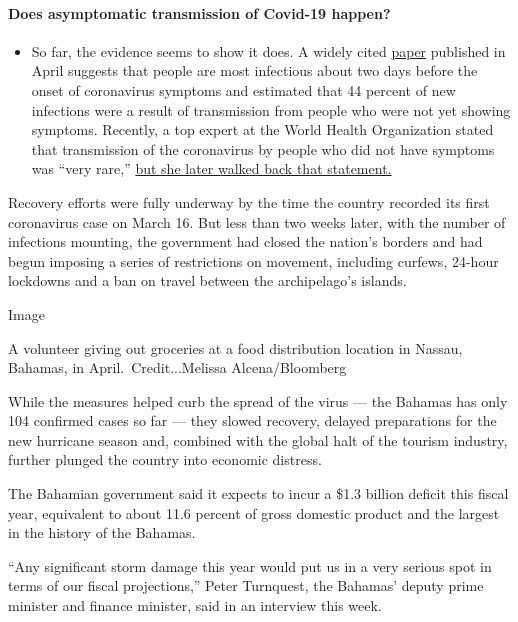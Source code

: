 \begin{itemize}
{  \paragraph{Does asymptomatic transmission of Covid-19
  happen?}\label{does-asymptomatic-transmission-of-covid-19-happen}}

  \begin{itemize}
  \tightlist
  \item
    So far, the evidence seems to show it does. A widely cited
    \href{https://www.nature.com/articles/s41591-020-0869-5}{paper}
    published in April suggests that people are most infectious about
    two days before the onset of coronavirus symptoms and estimated that
    44 percent of new infections were a result of transmission from
    people who were not yet showing symptoms. Recently, a top expert at
    the World Health Organization stated that transmission of the
    coronavirus by people who did not have symptoms was ``very rare,''
    \href{https://www.nytimes.com/2020/06/09/world/coronavirus-updates.html?action=click\&pgtype=Article\&state=default\&region=MAIN_CONTENT_3\&context=storylines_faq\#link-1f302e21}{but
    she later walked back that statement.}
  \end{itemize}
\end{itemize}

Recovery efforts were fully underway by the time the country recorded
its first coronavirus case on March 16. But less than two weeks later,
with the number of infections mounting, the government had closed the
nation's borders and had begun imposing a series of restrictions on
movement, including curfews, 24-hour lockdowns and a ban on travel
between the archipelago's islands.

Image

A volunteer giving out groceries at a food distribution location in
Nassau, Bahamas, in April.~Credit...Melissa Alcena/Bloomberg

While the measures helped curb the spread of the virus --- the Bahamas
has only 104 confirmed cases so far --- they slowed recovery, delayed
preparations for the new hurricane season and, combined with the global
halt of the tourism industry, further plunged the country into economic
distress.

The Bahamian government said it expects to incur a \$1.3 billion deficit
this fiscal year, equivalent to about 11.6 percent of gross domestic
product and the largest in the history of the Bahamas.

``Any significant storm damage this year would put us in a very serious
spot in terms of our fiscal projections,'' Peter Turnquest, the Bahamas'
deputy prime minister and finance minister, said in an interview this
week.

